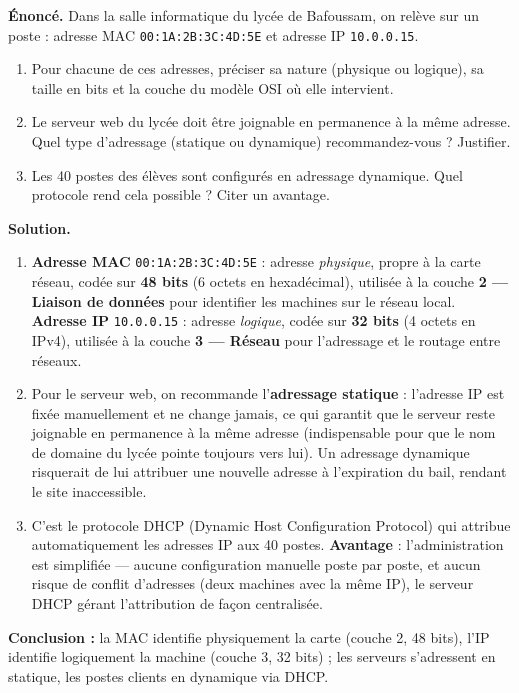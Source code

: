 \documentclass[11pt]{article}
\newcommand{\cle}[1]{{\popxbold\color{popdark}#1}}
\begin{document}
\begin{exoresolu}
\textbf{Énoncé.} Dans la salle informatique du lycée de Bafoussam, on relève sur un poste : adresse MAC \texttt{00:1A:2B:3C:4D:5E} et adresse IP \texttt{10.0.0.15}.
\begin{enumerate}
\item Pour chacune de ces adresses, préciser sa nature (physique ou logique), sa taille en bits et la couche du modèle OSI où elle intervient.
\item Le serveur web du lycée doit être joignable en permanence à la même adresse. Quel type d'adressage (statique ou dynamique) recommandez-vous ? Justifier.
\item Les 40 postes des élèves sont configurés en adressage dynamique. Quel protocole rend cela possible ? Citer un avantage.
\end{enumerate}
\tcblower
\textbf{Solution.}
\begin{enumerate}
\item \textbf{Adresse MAC} \texttt{00:1A:2B:3C:4D:5E} : adresse \emph{physique}, propre à la carte réseau, codée sur \textbf{48 bits} (6 octets en hexadécimal), utilisée à la couche \textbf{2 — Liaison de données} pour identifier les machines sur le réseau local. \textbf{Adresse IP} \texttt{10.0.0.15} : adresse \emph{logique}, codée sur \textbf{32 bits} (4 octets en IPv4), utilisée à la couche \textbf{3 — Réseau} pour l'adressage et le routage entre réseaux.
\item Pour le serveur web, on recommande l'\textbf{adressage statique} : l'adresse IP est fixée manuellement et ne change jamais, ce qui garantit que le serveur reste joignable en permanence à la même adresse (indispensable pour que le nom de domaine du lycée pointe toujours vers lui). Un adressage dynamique risquerait de lui attribuer une nouvelle adresse à l'expiration du bail, rendant le site inaccessible.
\item C'est le protocole \cle{DHCP} (Dynamic Host Configuration Protocol) qui attribue automatiquement les adresses IP aux 40 postes. \textbf{Avantage} : l'administration est simplifiée — aucune configuration manuelle poste par poste, et aucun risque de conflit d'adresses (deux machines avec la même IP), le serveur DHCP gérant l'attribution de façon centralisée.
\end{enumerate}
\textbf{Conclusion :} la MAC identifie physiquement la carte (couche 2, 48 bits), l'IP identifie logiquement la machine (couche 3, 32 bits) ; les serveurs s'adressent en statique, les postes clients en dynamique via DHCP.
\end{exoresolu}
\end{document}
